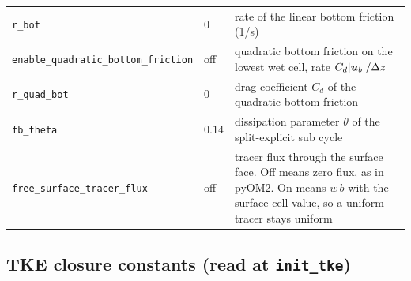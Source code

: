 \documentclass[12pt]{article}
\renewcommand{\v}[1]{{\mbox{\boldmath$ #1 $}}}  %
\begin{document}
\begin{longtable}{@{}llp{5.9cm}@{}}
\verb|r_bot| & $0$ & rate of the linear bottom friction (1/s) \\
\verb|enable_quadratic_bottom_friction| & off & quadratic bottom friction on
  the lowest wet cell, rate $C_d |\v u_b|/\Delta z$ \\
\verb|r_quad_bot| & $0$ & drag coefficient $C_d$ of the quadratic bottom
  friction \\
\verb|fb_theta| & $0.14$ & dissipation parameter $\theta$ of the
  split-explicit sub cycle \\
\verb|free_surface_tracer_flux| & off & tracer flux through the surface face.
  Off means zero flux, as in pyOM2. On means $w\, b$ with the surface-cell
  value, so a uniform tracer stays uniform \\
\hline
\end{longtable}

\subsection*{TKE closure constants (read at \texttt{init\_tke})}
\end{document}
